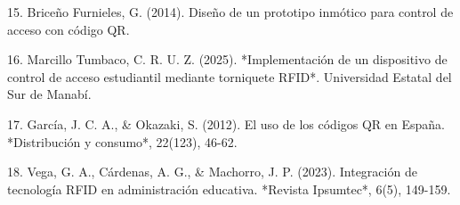 15. Briceño Furnieles, G. (2014). Diseño de un prototipo inmótico para control de acceso con código QR.

16. Marcillo Tumbaco, C. R. U. Z. (2025). *Implementación de un dispositivo de control de acceso estudiantil mediante torniquete RFID*. Universidad Estatal del Sur de Manabí.

17. García, J. C. A., \& Okazaki, S. (2012). El uso de los códigos QR en España. *Distribución y consumo*, 22(123), 46-62.

18. Vega, G. A., Cárdenas, A. G., \& Machorro, J. P. (2023). Integración de tecnología RFID en administración educativa. *Revista Ipsumtec*, 6(5), 149-159.

